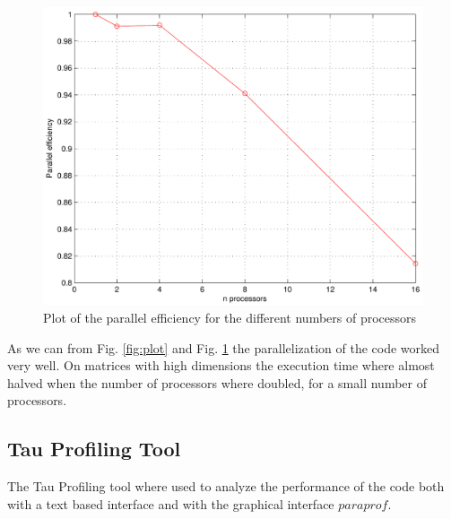 \begin{figure}[h!] 
 \center 
 \includegraphics[scale=0.7]{./figures/plot2.pdf}
 \caption{  Plot of the parallel efficiency for the different numbers of processors\label{fig:para}}
 \end{figure}

As we can from Fig. \ref{fig:plot} and Fig. \ref{fig:para} the parallelization of the code worked very well. On matrices with high dimensions the execution time where almost halved when the number of processors where doubled, for a small number of processors. 

\subsection*{Tau Profiling Tool}
The Tau Profiling tool where used to analyze the performance of the code both with a text based interface and with the graphical interface $paraprof$. 

